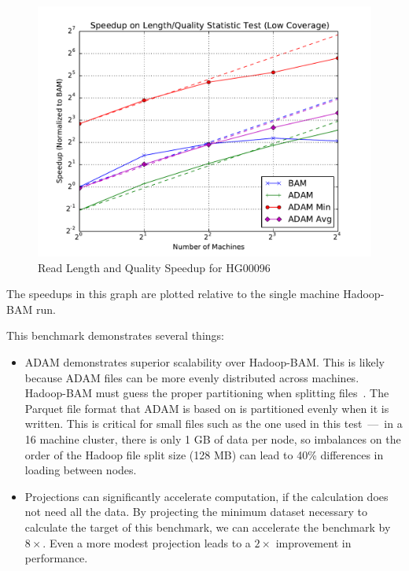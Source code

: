 \documentclass[10pt,twocolumn]{article}
\theoremstyle{plain}
\begin{document}
\begin{figure}[h]
\begin{center}
\includegraphics[width=\linewidth]{microbenchmarks/length_and_quality_low_coverage.pdf}
\end{center}
\caption{Read Length and Quality Speedup for HG00096}
\label{fig:length-quality}
\end{figure}

The speedups in this graph are plotted relative to the single machine Hadoop-BAM run.

This benchmark demonstrates several things:

\begin{itemize}
\item ADAM demonstrates superior scalability over Hadoop-BAM. This is likely because ADAM files can be more evenly distributed across machines.
Hadoop-BAM must guess the proper partitioning when splitting files~\cite{niemenmaa12}. The Parquet file format that ADAM is based on is partitioned
evenly when it is written\cite{parquet}. This is critical for small files such as the one used in this test~---~in a 16 machine cluster, there is only 1 GB of
data per node, so imbalances on the order of the Hadoop file split size (128 MB) can lead to 40\% differences in loading between nodes.
\item Projections can significantly accelerate computation, if the calculation does not need all the data. By projecting the minimum dataset necessary
to calculate the target of this benchmark, we can accelerate the benchmark by $8\times$. Even a more modest projection leads to a $2\times$
improvement in performance.
\end{itemize}
\end{document}
